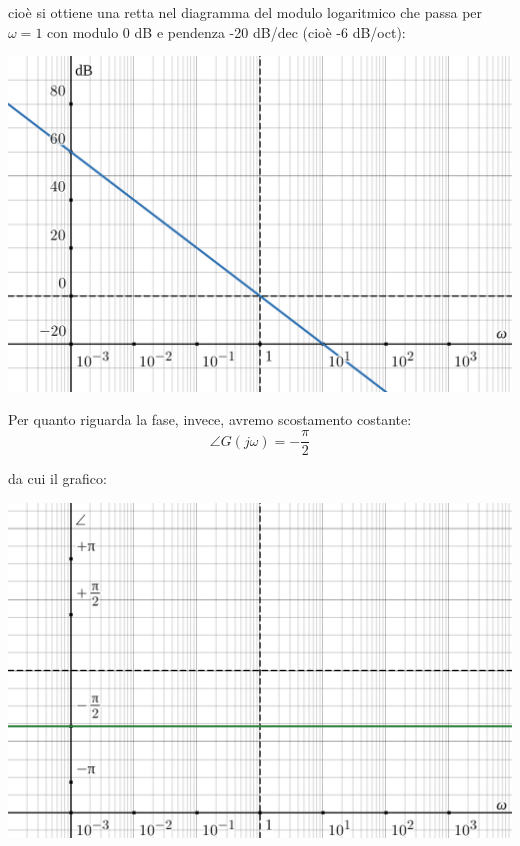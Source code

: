 \documentclass[a4paper,11pt]{article}
\begin{document}
\noindent
\begin{minipage}{\textwidth}
cioè si ottiene una retta nel diagramma del modulo logaritmico che passa per $\omega =1$ con modulo 0 dB e pendenza -20 dB/dec (cioè -6 dB/oct):
\begin{center}
	\includegraphics[scale=0.3]{../figures/integrator_bode/mod.png}
\end{center}
\end{minipage}

\par\medskip

Per quanto riguarda la fase, invece, avremo scostamento costante:
$$
\angle G(j \omega) = - \frac{\pi}{2}
$$

\par\medskip

\noindent
\begin{minipage}{\textwidth}
da cui il grafico:
\begin{center}
	\includegraphics[scale=0.3]{../figures/integrator_bode/phase.png}
\end{center}
\end{minipage}
\end{document}
